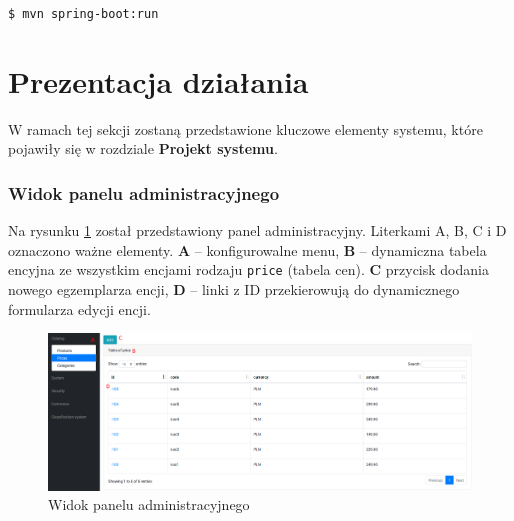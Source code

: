 \noindent
\texttt{\$ mvn spring-boot:run}

\section{Prezentacja działania}
W ramach tej sekcji zostaną przedstawione kluczowe elementy systemu, które pojawiły się w rozdziale \textbf{Projekt systemu}.  

\subsubsection{Widok panelu administracyjnego}
Na rysunku \ref{scr_adminmain} został przedstawiony panel administracyjny. Literkami A, B, C i D oznaczono ważne elementy. \textbf{A} -- konfigurowalne menu, \textbf{B} -- dynamiczna tabela encyjna ze wszystkim encjami rodzaju \texttt{price} (tabela cen). \textbf{C} przycisk dodania nowego egzemplarza encji, \textbf{D} -- linki z ID przekierowują do dynamicznego formularza edycji encji. 
\begin{figure}
	\begin{center}
		\includegraphics[width=1\textwidth]{admin-main.png}
	\end{center}
	\caption{{\color{black}Widok panelu administracyjnego}} \label{scr_adminmain}
\end{figure}

